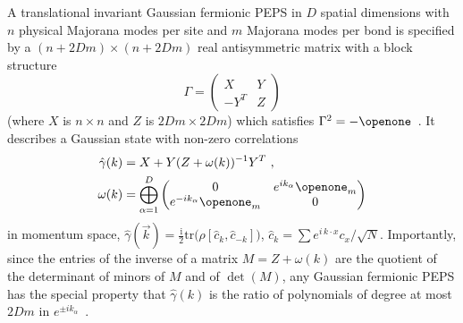 \documentclass[rmp,aps,reprint,superscriptaddress,nobalancelastpage]{revtex4-1}
\begin{document}
A translational invariant Gaussian fermionic PEPS in $D$ spatial dimensions with $n$ physical Majorana modes per site and $m$ Majorana modes per bond is specified by a $(n+2Dm)\times (n+2Dm)$ real antisymmetric matrix with a block structure
\[
    \Gamma = \begin{pmatrix}X & Y \\ -Y^T & Z \end{pmatrix}
\]
(where $X$ is $n\times n$ and $Z$ is $2Dm\times 2Dm$) which satisfies $\Gamma^2=-\openone$~\cite{kraus:fPEPS}.  It describes a Gaussian state with non-zero correlations
\begin{align*}
    \hat\gamma(k) & = X+Y(Z+\omega(k))^{-1}Y^T\ ,
    \\
    \omega(k)     & = \bigoplus_{\alpha=1}^D \begin{pmatrix} 0                        &e^{ik_\alpha}\openone_m\\
                e^{-ik_\alpha}\openone_m &0\end{pmatrix}
\end{align*}
in momentum space, $\hat\gamma(\vec k) =
    \tfrac{\mathrm i}{2}\mathrm{tr}\big(\rho[\hat c_k,\hat c_{-k}]\big)$, $\hat c_k=\sum e^{i\,k\cdot x}c_x/\sqrt{N}$.
Importantly, since the entries of the inverse of a matrix $M=Z+\omega(k)$ are the quotient of the determinant of minors of $M$ and of $\det(M)$, any Gaussian fermionic PEPS has the special property that $\hat\gamma(k)$ is the ratio of polynomials of degree at most $2Dm$ in $e^{\pm i k_\alpha}$~\cite{schuch:GMPS}.
\end{document}
